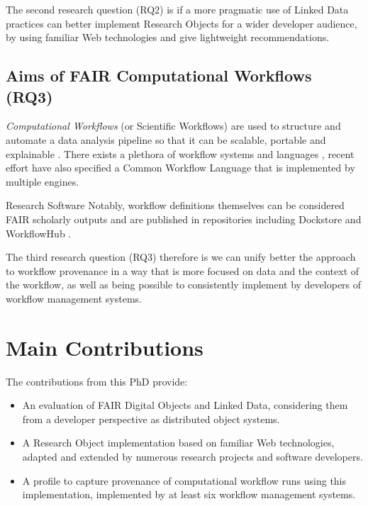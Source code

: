 The second research question (RQ2) is if a more pragmatic use of Linked Data practices can better implement Research Objects for a wider developer audience, by using familiar Web technologies and give lightweight recommendations.


\subsection{Aims of FAIR Computational Workflows (RQ3)}

\emph{Computational Workflows} (or Scientific Workflows) are used to structure and automate a data analysis pipeline so that it can be scalable, portable and explainable \cite{Atkinson 2017}. There exists a plethora of workflow systems \cite{Leipzig 2021} and languages \cite{Amstutz 2021}, recent effort have also specified a Common Workflow Language \cite{Crusoe 2022} that is implemented by multiple engines. 

Research Software \cite{Katz 2021a}
Notably, workflow definitions themselves can be considered FAIR scholarly outputs \cite{Goble 2020} and are published in repositories including Dockstore \cite{Yuen 2021} and WorkflowHub \cite{Goble 2021}.


The third research question (RQ3) therefore is we can unify better the approach to workflow provenance in a way that is more focused on data and the context of the workflow, as well as being possible to consistently implement by developers of workflow management systems.


\section{Main Contributions}

The contributions from this PhD provide:

\begin{itemize}
    \item An evaluation of FAIR Digital Objects and Linked Data, considering them from a developer perspective as distributed object systems.
    \item A Research Object implementation based on familiar Web technologies, adapted and extended by numerous research projects and software developers.
    \item A profile to capture provenance of computational workflow runs using this implementation, implemented by at least six workflow management systems.
\end{itemize}

